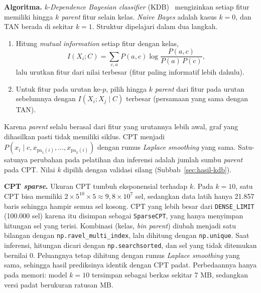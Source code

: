\textbf{Algoritma.} \textit{k-Dependence Bayesian classifier}
(KDB)~\cite{sahami1996kdb} mengizinkan setiap fitur memiliki hingga $k$
\textit{parent} fitur selain kelas. \textit{Naive Bayes} adalah kasus $k=0$,
dan TAN berada di sekitar $k=1$. Struktur dipelajari dalam dua langkah.
\begin{enumerate}
	\item Hitung \textit{mutual information} setiap fitur dengan kelas,
	\begin{equation}
		I(X_i;C)=\sum_{c,a}P(a,c)\log\frac{P(a,c)}{P(a)\,P(c)} ,
	\end{equation}
	lalu urutkan fitur dari nilai terbesar (fitur paling informatif lebih dahulu).
	\item Untuk fitur pada urutan ke-$p$, pilih hingga $k$ \textit{parent} dari
	fitur pada urutan sebelumnya dengan $I(X_i;X_j\mid C)$ terbesar (persamaan
	yang sama dengan TAN).
\end{enumerate}
Karena \textit{parent} selalu berasal dari fitur yang urutannya lebih awal, graf
yang dihasilkan pasti tidak memiliki siklus. CPT menjadi
$P(x_i\mid c,x_{\mathrm{pa}_1(i)},\dots,x_{\mathrm{pa}_k(i)})$ dengan rumus
\textit{Laplace smoothing} yang sama. Satu-satunya perubahan pada pelatihan dan
inferensi adalah jumlah sumbu \textit{parent} pada CPT. Nilai $k$ dipilih dengan
validasi silang (Subbab~\ref{sec:hasil-kdb}).



\textbf{CPT \textit{sparse}.} Ukuran CPT tumbuh eksponensial terhadap $k$. Pada
$k=10$, satu CPT bisa memiliki $2\times5^{10}\times5\approx 9{,}8\times10^{7}$ sel,
sedangkan data latih hanya 21.857 baris sehingga hampir semua sel kosong. CPT
yang lebih besar dari \texttt{DENSE\_LIMIT} (100.000 sel) karena itu disimpan
sebagai \texttt{SparseCPT}, yang hanya menyimpan hitungan sel yang terisi.
Kombinasi (kelas, \textit{bin parent}) diubah menjadi satu bilangan dengan
\texttt{np.ravel\_multi\_index}, lalu dihitung dengan \texttt{np.unique}. Saat
inferensi, hitungan dicari dengan \texttt{np.searchsorted}, dan sel yang tidak
ditemukan bernilai 0. Peluangnya tetap dihitung dengan rumus \textit{Laplace
smoothing} yang sama, sehingga hasil prediksinya identik dengan CPT padat.
Perbedaannya hanya pada memori: model $k=10$ tersimpan sebagai berkas sekitar 7 MB,
sedangkan versi padat berukuran ratusan MB.



